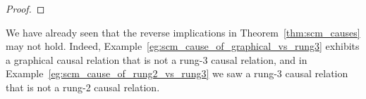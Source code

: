 \begin{proof}
%
%
\end{proof}

We have already seen that the reverse implications in Theorem~\ref{thm:scm_causes} may not hold.
Indeed, Example~\ref{eg:scm_cause_of_graphical_vs_rung3} exhibits a graphical causal relation that is not a rung-3 causal relation, and in Example~\ref{eg:scm_cause_of_rung2_vs_rung3} we saw a rung-3 causal relation that is not a rung-2 causal relation.

